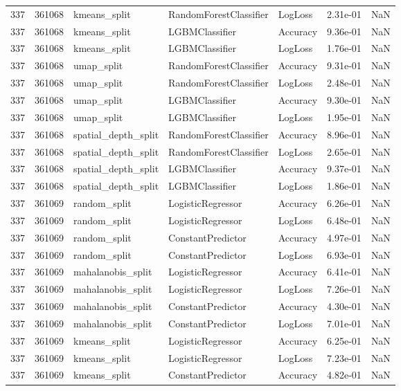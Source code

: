 \begin{tabular}{rrlllrr}
337 & 361068 & kmeans\_split & RandomForestClassifier & LogLoss & 2.31e-01 & NaN \\
337 & 361068 & kmeans\_split & LGBMClassifier & Accuracy & 9.36e-01 & NaN \\
337 & 361068 & kmeans\_split & LGBMClassifier & LogLoss & 1.76e-01 & NaN \\
337 & 361068 & umap\_split & RandomForestClassifier & Accuracy & 9.31e-01 & NaN \\
337 & 361068 & umap\_split & RandomForestClassifier & LogLoss & 2.48e-01 & NaN \\
337 & 361068 & umap\_split & LGBMClassifier & Accuracy & 9.30e-01 & NaN \\
337 & 361068 & umap\_split & LGBMClassifier & LogLoss & 1.95e-01 & NaN \\
337 & 361068 & spatial\_depth\_split & RandomForestClassifier & Accuracy & 8.96e-01 & NaN \\
337 & 361068 & spatial\_depth\_split & RandomForestClassifier & LogLoss & 2.65e-01 & NaN \\
337 & 361068 & spatial\_depth\_split & LGBMClassifier & Accuracy & 9.37e-01 & NaN \\
337 & 361068 & spatial\_depth\_split & LGBMClassifier & LogLoss & 1.86e-01 & NaN \\
337 & 361069 & random\_split & LogisticRegressor & Accuracy & 6.26e-01 & NaN \\
337 & 361069 & random\_split & LogisticRegressor & LogLoss & 6.48e-01 & NaN \\
337 & 361069 & random\_split & ConstantPredictor & Accuracy & 4.97e-01 & NaN \\
337 & 361069 & random\_split & ConstantPredictor & LogLoss & 6.93e-01 & NaN \\
337 & 361069 & mahalanobis\_split & LogisticRegressor & Accuracy & 6.41e-01 & NaN \\
337 & 361069 & mahalanobis\_split & LogisticRegressor & LogLoss & 7.26e-01 & NaN \\
337 & 361069 & mahalanobis\_split & ConstantPredictor & Accuracy & 4.30e-01 & NaN \\
337 & 361069 & mahalanobis\_split & ConstantPredictor & LogLoss & 7.01e-01 & NaN \\
337 & 361069 & kmeans\_split & LogisticRegressor & Accuracy & 6.25e-01 & NaN \\
337 & 361069 & kmeans\_split & LogisticRegressor & LogLoss & 7.23e-01 & NaN \\
337 & 361069 & kmeans\_split & ConstantPredictor & Accuracy & 4.82e-01 & NaN \\

\end{tabular}
